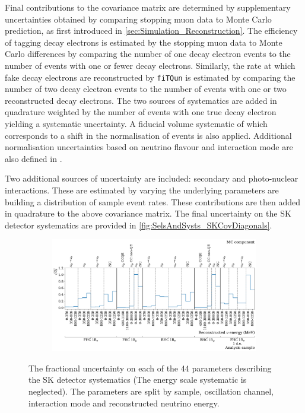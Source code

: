 Final contributions to the covariance matrix are determined by supplementary uncertainties obtained by comparing stopping muon data to Monte Carlo prediction, as first introduced in \autoref{sec:Simulation_Reconstruction}. The efficiency of tagging decay electrons is estimated by the stopping muon data to Monte Carlo differences by comparing the number of one decay electron events to the number of events with one or fewer decay electrons. Similarly, the rate at which fake decay electrons are reconstructed by \texttt{fiTQun} is estimated by comparing the number of two decay electron events to the number of events with one or two reconstructed decay electrons. The two sources of systematics are added in quadrature weighted by the number of events with one true decay electron yielding a  systematic uncertainty.
A fiducial volume systematic of  which corresponds to a  shift in the normalisation of events is also applied. Additional normalisation uncertainties based on neutrino flavour and interaction mode are also defined in \cite{t2k_tn_399, t2k_tn_186, t2k_tn_107}.

Two additional sources of uncertainty are included: secondary and photo-nuclear interactions. These are estimated by varying the underlying parameters are building a distribution of sample event rates. These contributions are then added in quadrature to the above covariance matrix. The final uncertainty on the SK detector systematics are provided in \autoref{fig:SelsAndSysts_SKCovDiagonals}. 

\begin{figure}[h]
  \begin{subfigure}[t]{0.9\textwidth}
    \includegraphics[width=\textwidth, trim={0mm 0mm 0mm 0mm}, clip,page=1]{Figures/Selections/SK_Error_2020_Erec.pdf}
  \end{subfigure}
  \caption{The fractional uncertainty on each of the 44 parameters describing the SK detector systematics (The energy scale systematic is neglected). The parameters are split by sample, oscillation channel, interaction mode and reconstructed neutrino energy.}
  \label{fig:SelsAndSysts_SKCovDiagonals}
\end{figure}

